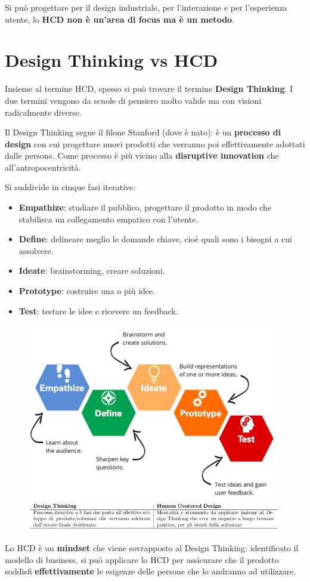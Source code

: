\documentclass[a4paper,11pt,oneside]{book}
\begin{document}
Si può progettare per il design industriale, per l'interazione e per l'esperienza utente, lo \textbf{HCD non è un'area di focus ma è un metodo}.

\section{Design Thinking vs HCD}
Insieme al termine HCD, spesso si può trovare il termine \textbf{Design Thinking}. I due termini vengono da scuole di pensiero molto valide ma con visioni radicalmente diverse.

Il Design Thinking segue il filone Stanford (dove è nato): è un \textbf{processo di design} con cui progettare nuovi prodotti che verranno poi effettivamente adottati dalle persone. Come processo è più vicino alla \textbf{disruptive innovation} che all'antropocentricità.

Si suddivide in cinque fasi iterative:

\begin{itemize}
	\item \textbf{Empathize}: studiare il pubblico, progettare il prodotto in modo che stabilisca un collegamento empatico con l'utente.
	\item \textbf{Define}: delineare meglio le domande chiave, cioè quali sono i bisogni a cui assolvere.
	\item \textbf{Ideate}: brainstorming, creare soluzioni.
	\item \textbf{Prototype}: costruire una o più idee.
	\item \textbf{Test}: testare le idee e ricevere un feedback.
\end{itemize}

\begin{figure}
	\centering
	\includegraphics[scale=0.5]{immagini/Fasi Design Thinking.png}
	\includegraphics[scale=0.4]{immagini/Design Thinking vs HCD.png}
\end{figure}
Lo HCD è un \textbf{mindset} che viene sovrapposto al Design Thinking: identificato il modello di business, si può applicare lo HCD per assicurare che il prodotto soddisfi \textbf{effettivamente} le esigenze delle persone che lo andranno ad utilizzare.
\end{document}
